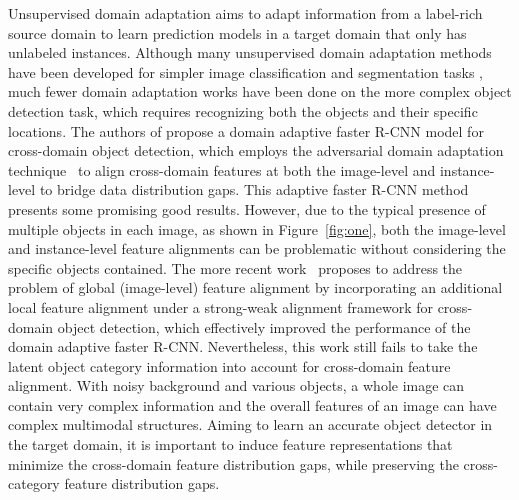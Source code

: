 \documentclass[runningheads]{llncs}
\begin{document}
Unsupervised domain adaptation aims to adapt information from a label-rich source domain 
to learn prediction models in a target domain that only has unlabeled instances. 
Although many unsupervised domain adaptation methods have been developed for simpler 
image classification and segmentation tasks
\cite{ganin2016domain,long2018conditional,cicek2019unsupervised,zhang2017curriculum,tsai2018learning,tsai2019domain}, 
much fewer domain adaptation works have been done on the more complex object detection task,
which requires recognizing both the objects and their specific locations.
The authors of \cite{chen2018domain} propose a domain adaptive faster R-CNN model for cross-domain object detection,
which employs the 
adversarial domain adaptation technique~\cite{ganin2016domain} 
to align cross-domain features at both the image-level and instance-level to bridge data distribution gaps.
This adaptive faster R-CNN method presents some promising good results.
However, due to the typical presence of multiple objects in each image, as shown in Figure~\ref{fig:one},
both the image-level and instance-level feature alignments can be problematic without considering the specific objects contained.
The more recent work~\cite{saito2019strong} proposes to address the problem of global (image-level) feature alignment 
by incorporating an additional local feature alignment under a strong-weak alignment framework for cross-domain object detection,
which effectively improved the performance of the domain adaptive faster R-CNN.
Nevertheless, this work still fails to take the latent object category information into account
for cross-domain feature alignment. 
With noisy background and various objects, 
a whole image can contain very complex information
and the overall features of an image can have complex multimodal structures. 
Aiming to learn an accurate object detector in the target domain, it is important to induce feature representations 
that minimize the cross-domain feature distribution gaps, while preserving the cross-category feature distribution gaps.
\end{document}
